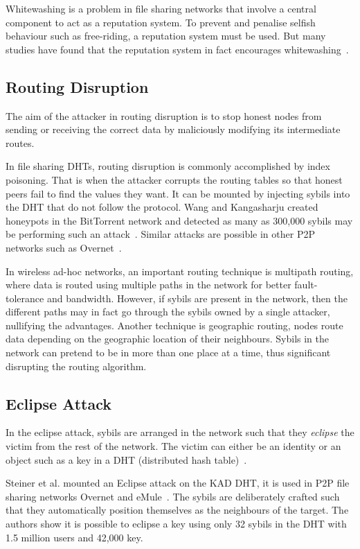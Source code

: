 Whitewashing is a problem in file sharing networks that involve a central
component to act as a reputation system. To prevent and penalise selfish
behaviour such as free-riding, a reputation system must be used. But many
studies have found that the reputation system in fact encourages
whitewashing~\cite{feldman2004free, yang2005empirical}.

\subsection{Routing Disruption}\label{sec:routing-disruption}
The aim of the attacker in routing disruption is to stop honest nodes from
sending or receiving the correct data by maliciously modifying its intermediate
routes.

In file sharing DHTs, routing disruption is commonly accomplished by index
poisoning. That is when the attacker corrupts the routing tables so that honest
peers fail to find the values they want. It can be mounted by injecting sybils
into the DHT that do not follow the protocol. Wang and Kangasharju created
honeypots in the BitTorrent network and detected as many as 300,000 sybils may
be performing such an attack~\cite{wang2012real}. Similar attacks are possible
in other P2P networks such as Overnet~\cite{liang2006index}.

In wireless ad-hoc networks, an important routing technique is multipath
routing, where data is routed using multiple paths in the network for better
fault-tolerance and bandwidth. However, if sybils are present in the network,
then the different paths may in fact go through the sybils owned by a single
attacker, nullifying the advantages. Another technique is geographic routing,
nodes route data depending on the geographic location of their neighbours.
Sybils in the network can pretend to be in more than one place at a time, thus
significant disrupting the routing algorithm\cite{karlof2003secure}.

\subsection{Eclipse Attack}
In the eclipse attack, sybils are arranged in the network such that they
\emph{eclipse} the victim from the rest of the network. The victim can either be
an identity or an object such as a key in a DHT (distributed hash
table)~\cite{singh2006eclipse}.

Steiner et al. mounted an Eclipse attack on the KAD DHT, it is used in P2P file
sharing networks Overnet and eMule~\cite{steiner2007exploiting}. The sybils are
deliberately crafted such that they automatically position themselves as the
neighbours of the target. The authors show it is possible to eclipse a key using
only 32 sybils in the DHT with 1.5 million users and 42,000 key.

